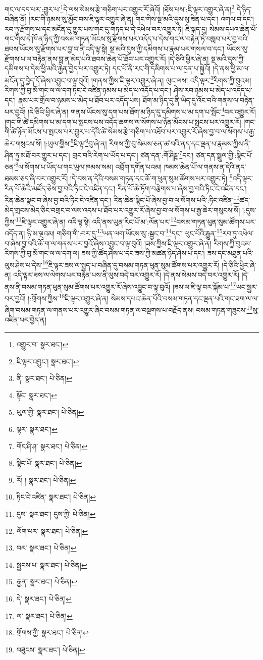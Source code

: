 གང་ལ་དད་པར་:གྱུར་པ་\footnote{འགྱུར་བ་  སྣར་ཐང་། }དེ་ལས་སེམས་རྩེ་གཅིག་པར་འགྱུར་རོ་ཞེའོ། །ཐོས་པས་:ཇི་ལྟར་འགྱུར་ཞེ་ན།\footnote{ཇི་ལྟར་འབྱུང་།  སྣར་ཐང་། } དེ་ཉིད་བཞིན་ནོ། །རང་གི་ཉམས་སུ་མྱོང་བས་ཇི་ལྟར་འགྱུར་ཞེ་ན། གང་གིས་སྔ་མའི་དུས་སུ་ཟིན་པ་དང་། འགལ་བ་དང་། རབ་ཏུ་རྫོགས་པ་དང་མངོན་དུ་གྱུར་པས་གང་དུ་གཏད་པ་དེ་འཕེལ་བར་འགྱུར་ཏེ། ཇི་སྐད་དུ། སེམས་དཔའ་ཆེན་པོ་གང་གིས་དེ་ཁོ་ན་ཉིད་ཀྱི་བསམ་གཏན་ཡོངས་སུ་རྫོགས་པར་འདོད་པ་དེས་གང་ལ་བརྟེན་ཏེ་བསླབ་པར་བྱ་བའི་ཐབས་ཡོངས་སུ་རྫོགས་པར་བྱ་བ་ནི་འདི་ལྟ་སྟེ། སྔ་མའི་དུས་ཀྱི་དམིགས་པ་རྣམ་པར་གསལ་བ་དང་། ཡོངས་སུ་རྫོགས་པ་ལ་བརྟེན་ནས་བླ་ན་མེད་པའི་ཐབས་ཆེན་པོ་ཐོབ་པར་འགྱུར་རོ། །དེ་ཅིའི་ཕྱིར་ཞེ་ན། སྔ་མའི་དུས་ཀྱི་དམིགས་པ་དེས་ཕྱི་མའི་རྐྱེན་བྱེད་པར་འགྱུར་ཏེ། དང་པོ་ནི་རང་གི་དམིགས་པ་ལ་དྲན་པ་སྐྱེའོ། །དེ་ནས་ཕྱི་མ་ལ་མངོན་དུ་བྱེད་དོ་ཞེས་འབྱུང་བ་ལྟ་བུའོ། །གནས་ཀྱིས་ཇི་ལྟར་འགྱུར་ཞེ་ན། ལུང་ལས། འདི་ལྟར་\footnote{ནི་  སྣར་ཐང་།  པེ་ཅིན། }རིགས་ཀྱི་བུའམ། རིགས་ཀྱི་བུ་མོ་གང་ལ་ལ་དག་ཏིང་ངེ་འཛིན་ཉམས་པ་མེད་པ་འདོད་པ་དང་། ཤེས་རབ་ཉམས་པ་མེད་པ་འདོད་པ་དང་། རྣམ་པར་གྲོལ་བ་ཉམས་པ་མེད་པ་ཐོབ་པར་འདོད་པས། ཐོག་མ་ཉིད་དུ་ནི་ཡིད་དུ་འོང་བའི་གནས་ལ་བརྟེན་པར་བྱའོ། །དེ་ཅིའི་ཕྱིར་ཞེ་ན། གནས་ཡོངས་སུ་དག་པས་ཐོག་མ་ཉིད་དུ་དམིགས་པ་མ་དག་པ་སྤོང་\footnote{སྟོང་  སྣར་ཐང་། }བར་འགྱུར་རོ། །གང་གི་ཚེ་དམིགས་པ་མ་དག་པ་སྤངས་པས་འདོད་ཆགས་ལ་སོགས་པ་ཉོན་མོངས་པ་སྤངས་པར་འགྱུར་རོ། །གང་གི་ཚེ་ཉོན་མོངས་པ་སྤངས་པར་གྱུར་པ་དེའི་ཚེ་སེམས་རྩེ་གཅིག་པ་འཐོབ་པར་འགྱུར་རོ་ཞེས་བྱ་བ་ལ་སོགས་པ་རྒྱ་ཆེར་གསུངས་སོ། །:ཡུལ་གྱིས་\footnote{ཡུལ་གྱི་  སྣར་ཐང་།  པེ་ཅིན། }ཇི་ལྟ་\footnote{ལྟར་  སྣར་ཐང་། }བུ་ཞེ་ན། རིགས་ཀྱི་བུ་སེམས་ཅན་ཚ་བའི་ནད་དང་ལྡན་པ་རྣམས་ཀྱིས་ནི་ཤིན་ཏུ་མཐོ་བར་གྱུར་པ་དང་། གྲང་བའི་རེག་པ་ཡོད་པ་དང་། ཙན་དན་:གོ་ཤིཪྵ་\footnote{གོང་ཤི་ཤ་  སྣར་ཐང་།  པེ་ཅིན། }དང་། ཙན་དན་སྦྲུལ་གྱི་:སྙིང་པོ་ཅན་\footnote{སྙིང་པོ་  སྣར་ཐང་།  པེ་ཅིན། }ལ་སོགས་པ་ཡོད་པ་གང་ཡུལ་ཁམས་སམ། འབྲོག་དགོན་པའམ། ཁམས་ཆེན་པོ་ལ་གནས་ན་དེའི་ནད་ཐམས་ཅད་ཞི་བར་འགྱུར་རོ། །དེ་བས་ན་དེའི་བསམ་གཏན་དང་ཆོ་ག་ཕུན་སུམ་ཚོགས་པར་འགྱུར་ཏེ། \footnote{རོ། །   སྣར་ཐང་།  པེ་ཅིན། }འདི་ལྟར་རིན་པོ་ཆེའི་མཛོད་ཅེས་བྱ་བའི་ཏིང་ངེ་འཛིན་དང་། རིན་པོ་ཆེ་ཏོག་བརྩེགས་པ་ཞེས་བྱ་བའི་ཏིང་ངེ་འཛིན་དང་། རིན་ཆེན་སྣང་བ་ཞེས་བྱ་བའི་ཏིང་ངེ་འཛིན་དང་། རིན་ཆེན་སྙིང་པོ་ཞེས་བྱ་བ་ལ་སོགས་པའི་:ཏིང་འཛིན་\footnote{ཏིང་ངེ་འཛིན་  སྣར་ཐང་།  པེ་ཅིན། }ཚད་མེད་གྲངས་མེད་ཅིང་བགྲང་བ་ལས་འདས་པ་ཐོབ་པར་འགྱུར་རོ་ཞེས་བྱ་བ་ལ་སོགས་པ་རྒྱ་ཆེར་གསུངས་སོ། །:དུས་ཀྱིས་\footnote{དུས་  སྣར་ཐང་། དུས་ཀྱི་  པེ་ཅིན། }ཇི་ལྟར་འགྱུར་ཞེ་ན། འདི་ལྟ་སྟེ། འདི་ནས་ཡུན་རིང་པོ་མ་:ལོན་པར་\footnote{ལོག་པར་  སྣར་ཐང་།  པེ་ཅིན། }བསམ་གཏན་ཕུན་སུམ་ཚོགས་པར་འདོད་ན། ཉི་མ་ལྔའམ། གཅིག་གི་:བར་དུ་\footnote{བར་  སྣར་ཐང་།  པེ་ཅིན། }ཡན་ལག་ཡོངས་སུ་:སྦྱང་བ་\footnote{སྦྱངས་པ་  སྣར་ཐང་།  པེ་ཅིན། }དང་། ཕུང་པོའི་རྒྱུན་\footnote{རྒྱན་  སྣར་ཐང་།  པེ་ཅིན། }རབ་ཏུ་འཕེལ་བ་ཞེས་བྱ་བའི་ཆོ་ག་ལ་གནས་པར་བྱའོ་ཞེས་འབྱུང་བ་ལྟ་བུའོ། །ཟས་ཀྱིས་ཇི་ལྟར་འགྱུར་ཞེ་ན། རིགས་ཀྱི་བུའམ་རིགས་ཀྱི་བུ་མོ་གང་ལ་ལ་དག་ལ། ཟས་ཀྱི་ཚོད་ཤེས་པ་དང་ཟས་ཀྱི་མཚན་ཉིད་ཤེས་པ་དང་། ཟས་དང་མཐུན་པའི་ལུས་ཤེས་པ་དེས་\footnote{དེ་  སྣར་ཐང་།  པེ་ཅིན། }ཇི་ལྟར་ཟས་ལ་སྤྱད་པ་བཞིན་དུ་བསམ་གཏན་ཕུན་སུམ་ཚོགས་པར་འགྱུར་རོ། །དེ་ཅིའི་ཕྱིར་ཞེ་ན། འདི་ལྟར་ཟས་ལ་ལེགས་པར་བརྟེན་པས་ནི་ལུས་བདེ་བར་འགྱུར་རོ། །དེ་ནས་སེམས་བདེ་བར་འགྱུར་རོ། །དེ་ནས་ནི་བསམ་གཏན་ཕུན་སུམ་ཚོགས་པར་འགྱུར་རོ་ཞེས་འབྱུང་བ་ལྟ་བུའོ། །ཟས་ལ་ཇི་ལྟ་བར་སྐོམ་པ་\footnote{ལ་  སྣར་ཐང་།  པེ་ཅིན། }ཡང་སྦྱར་བར་བྱའོ། །:གྲོགས་ཀྱིས་\footnote{གྲོགས་ཀྱི་  སྣར་ཐང་།  པེ་ཅིན། }ཇི་ལྟར་འགྱུར་ཞེ་ན། སེམས་དཔའ་ཆེན་པོའི་བསམ་གཏན་དང་ལྡན་པའི་གང་ཟག་ལ་ལ་ཞིག་བསམ་གཏན་ལ་གནས་པར་འགྱུར་ཞིང་བསམ་གཏན་ལ་བསྔགས་པ་བརྗོད་ནས། བསམ་གཏན་གཟུངས་\footnote{བཟུངས་  སྣར་ཐང་།  པེ་ཅིན། }སུ་འཛིན་པར་བྱེད་ན། 